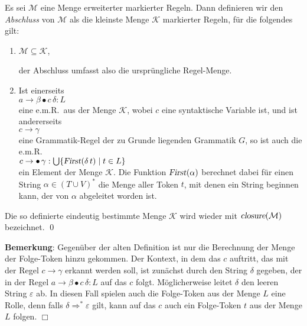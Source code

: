 \begin{Definition}
  Es sei $\mathcal{M}$ eine Menge erweiterter markierter Regeln.  Dann definieren wir den
  \emph{Abschluss} von $\mathcal{M}$
  als die kleinste Menge $\mathcal{K}$ markierter Regeln, f\"ur die folgendes gilt:
  \begin{enumerate}
  \item $\mathcal{M} \subseteq \mathcal{K}$,

        der Abschluss umfasst also die urspr\"ungliche Regel-Menge.
  \item Ist einerseits
        \\[0.2cm]
        \hspace*{1.3cm}
        $a \rightarrow \beta \bullet c\, \delta: L$
        \\[0.2cm]
        eine e.m.R.~aus der Menge $\mathcal{K}$, wobei $c$ eine syntaktische
        Variable ist, und ist andererseits
        \\[0.2cm]
        \hspace*{1.3cm}
        $c \rightarrow \gamma$
        \\[0.2cm]
        eine Grammatik-Regel der zu Grunde liegenden Grammatik $G$, so ist auch die e.m.R.
        \\[0.2cm]
        \hspace*{1.3cm}
        $c \rightarrow \bullet\, \gamma: \bigcup \{ \textsl{First}(\delta\, t) \mid t \in L \}$
        \\[0.2cm]
        ein Element der Menge $\mathcal{K}$.  Die Funktion $\textsl{First}(\alpha)$ berechnet dabei f\"ur
        einen String $\alpha \in (T \cup V)^*$ die Menge aller Token $t$, mit denen ein String
        beginnen kann, der von $\alpha$ abgeleitet worden ist.
  \end{enumerate}
  Die so definierte eindeutig bestimmte Menge $\mathcal{K}$ wird wieder mit
  $\textsl{closure}(\mathcal{M})$ bezeichnet. \qed
\end{Definition}

\noindent
\textbf{Bemerkung}:  Gegen\"uber der alten Definition ist nur die Berechnung der Menge
der Folge-Token hinzu gekommen.  Der Kontext, in dem das $c$ auftritt, das mit der Regel
$c \rightarrow \gamma$ erkannt werden soll, ist zun\"achst durch den String $\delta$ gegeben,
der in der Regel $a \rightarrow \beta \bullet c\, \delta:L$ auf das $c$ folgt.
M\"oglicherweise leitet $\delta$  den leeren String $\varepsilon$ ab.  In diesen Fall  
spielen auch die Folge-Token aus der Menge $L$ eine Rolle, denn falls
$\delta \Rightarrow^* \varepsilon$ gilt, kann auf das $c$ auch ein Folge-Token $t$ aus der
Menge $L$ folgen. \hspace*{\fill} $\Box$
\vspace*{0.1cm}

